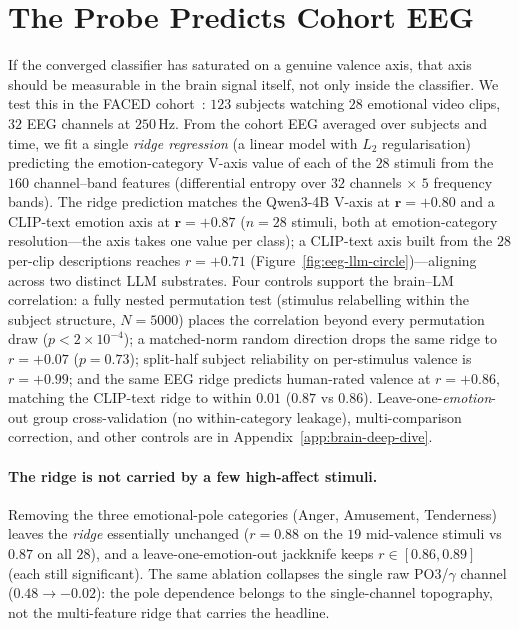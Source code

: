 \section{The Probe Predicts Cohort EEG}
\label{sec:vaxis-brain}

If the converged classifier has saturated on a genuine valence axis,
that axis should be measurable in the brain signal itself, not only
inside the classifier. We test this in the FACED
cohort~\citep{chen2023faced}: $123$ subjects watching $28$
emotional video clips, $32$ EEG channels at $250$\,Hz. From the
cohort EEG averaged over subjects and time, we fit a single
\emph{ridge regression} (a linear model with $L_2$ regularisation)
predicting the emotion-category V-axis value of each of the $28$
stimuli from the $160$ channel--band features (differential
entropy over $32$ channels $\times$ $5$ frequency bands). The ridge
prediction matches the Qwen3-4B V-axis at $\mathbf{r{=}{+}0.80}$ and a
CLIP-text emotion axis at $\mathbf{r{=}{+}0.87}$ ($n{=}28$ stimuli, both at
emotion-category resolution---the axis takes one value per class); a
CLIP-text axis built from the $28$ per-clip descriptions reaches
$r{=}{+}0.71$ (Figure~\ref{fig:eeg-llm-circle})---aligning
across two distinct LLM substrates. Four controls support the brain--LM correlation: a fully nested
permutation test (stimulus relabelling within the subject structure,
$N{=}5000$) places the correlation beyond every permutation draw
($p<2{\times}10^{-4}$); a matched-norm
random direction drops the same ridge to $r{=}{+}0.07$ ($p{=}0.73$);
split-half subject reliability on per-stimulus valence is $r{=}{+}0.99$;
and the same EEG ridge predicts human-rated valence at $r{=}{+}0.86$,
matching the CLIP-text ridge to within $0.01$ ($0.87$ vs $0.86$).
Leave-one-\emph{emotion}-out group cross-validation (no within-category
leakage), multi-comparison correction, and other controls are in
Appendix~\ref{app:brain-deep-dive}.

\paragraph{The ridge is not carried by a few high-affect stimuli.}
Removing the three emotional-pole categories (Anger, Amusement,
Tenderness) leaves the \emph{ridge} essentially unchanged ($r{=}0.88$ on
the $19$ mid-valence stimuli vs $0.87$ on all $28$), and a
leave-one-emotion-out jackknife keeps $r\in[0.86,0.89]$ (each still
significant). The same ablation collapses the single raw PO3/$\gamma$
channel ($0.48 \to -0.02$): the pole dependence belongs to the
single-channel topography, not the multi-feature ridge that carries the
headline.

